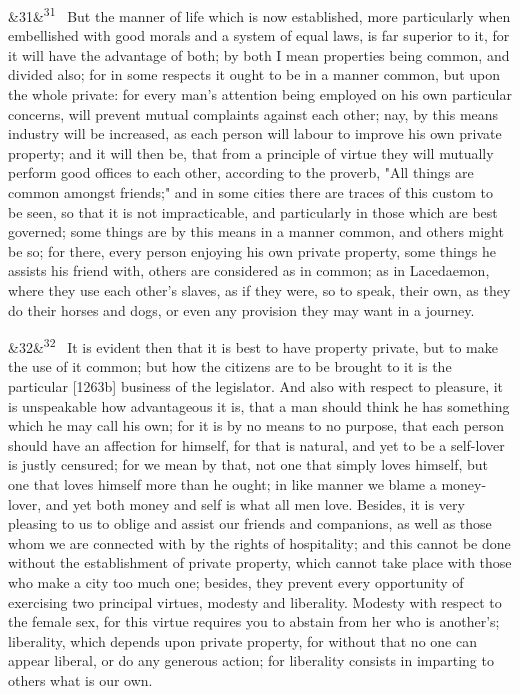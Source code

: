 \documentclass[12pt]{article}
\newcommand{\para}[1][]{\par\noindent\ifx&#1&\else\textsuperscript{\footnotesize #1}~\fi}
\begin{document}
\para[31] But the manner of life which is now established, more particularly when embellished with good morals and a system of equal laws, is far superior to it, for it will have the advantage of both; by both I mean properties being common, and divided also; for in some respects it ought to be in a manner common, but upon the whole private: for every man's attention being employed on his own particular concerns, will prevent mutual complaints against each other; nay, by this means industry will be increased, as each person will labour to improve his own private property; and it will then be, that from a principle of virtue they will mutually perform good offices to each other, according to the proverb, "All things are common amongst friends;" and in some cities there are traces of this custom to be seen, so that it is not impracticable, and particularly in those which are best governed; some things are by this means in a manner common, and others might be so; for there, every person enjoying his own private property, some things he assists his friend with, others are considered as in common; as in Lacedaemon, where they use each other's slaves, as if they were, so to speak, their own, as they do their horses and dogs, or even any provision they may want in a journey.

\para[32] It is evident then that it is best to have property private, but to make the use of it common; but how the citizens are to be brought to it is the particular [1263b] business of the legislator. And also with respect to pleasure, it is unspeakable how advantageous it is, that a man should think he has something which he may call his own; for it is by no means to no purpose, that each person should have an affection for himself, for that is natural, and yet to be a self-lover is justly censured; for we mean by that, not one that simply loves himself, but one that loves himself more than he ought; in like manner we blame a money-lover, and yet both money and self is what all men love. Besides, it is very pleasing to us to oblige and assist our friends and companions, as well as those whom we are connected with by the rights of hospitality; and this cannot be done without the establishment of private property, which cannot take place with those who make a city too much one; besides, they prevent every opportunity of exercising two principal virtues, modesty and liberality. Modesty with respect to the female sex, for this virtue requires you to abstain from her who is another's; liberality, which depends upon private property, for without that no one can appear liberal, or do any generous action; for liberality consists in imparting to others what is our own.
\end{document}

